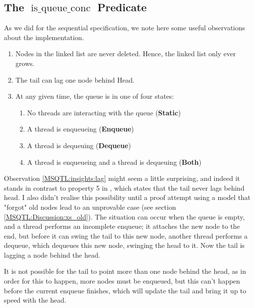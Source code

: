 \documentclass[twoside,11pt,openright]{report}
\newcommand{\isqueueconc}{\operatorname{is\_queue\_conc}}
\newcommand{\StaticState}{\textbf{Static}}
\newcommand{\EnqueueState}{\textbf{Enqueue}}
\newcommand{\DequeueState}{\textbf{Dequeue}}
\newcommand{\BothState}{\textbf{Both}}
\begin{document}
\subsection[The isqueueconc predicate]{The $\isqueueconc$ Predicate}
As we did for the sequential specification, we note here some useful observations about the implementation.
\begin{enumerate}
  \item\label{MSQTL:insights:oldnodes} Nodes in the linked list are never deleted. Hence, the linked list only ever grows.
  \item\label{MSQTL:insights:lag} The tail can lag one node behind Head.
  \item\label{MSQTL:insights:states} At any given time, the queue is in one of four states:
    \begin{enumerate}
      \item\label{MSQTL:insights:state:static} No threads are interacting with the queue (\StaticState)
      \item\label{MSQTL:insights:state:enqueue} A thread is enqueueing (\EnqueueState)
      \item\label{MSQTL:insights:state:dequeue} A thread is dequeuing (\DequeueState)
      \item\label{MSQTL:insights:state:both} A thread is enqueueing and a thread is dequeuing (\BothState)
    \end{enumerate}
\end{enumerate}

Observation \ref{MSQTL:insights:lag} might seem a little surprising, and indeed it stands in contrast to property 5 in \cite{DBLP:conf/podc/MichaelS96}, which states that the tail never lags behind head. I also didn't realise this possibility until a proof attempt using a model that "forgot" old nodes lead to an unprovable case (see section \ref{MSQTL:Discussion:xs_old}). The situation can occur when the queue is empty, and a thread performs an incomplete enqueue; it attaches the new node to the end, but before it can swing the tail to this new node, another thread performs a dequeue, which dequeues this new node, swinging the head to it. Now the tail is lagging a node behind the head.

It is not possible for the tail to point more than one node behind the head, as in order for this to happen, more nodes must be enqueued, but this can't happen before the current enqueue finishes, which will update the tail and bring it up to speed with the head.
\end{document}
